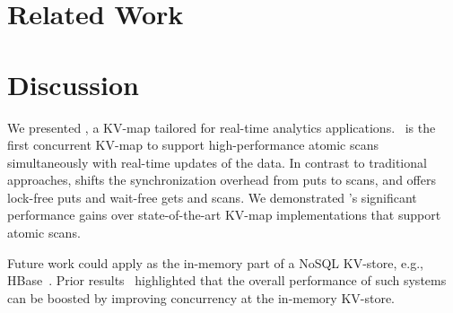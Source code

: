 \documentclass[10pt,preprint,numbers]{sigplanconf}
\begin{document}





\section{Related Work}
\label{sec:related}






\section{Discussion}
\label{sec:disc}

We presented {\kiwi}, a KV-map tailored for real-time analytics applications. \kiwi\ is the first
concurrent KV-map to support high-performance atomic scans simultaneously with real-time updates of the data.
In contrast to traditional approaches, {\kiwi} shifts the synchronization
overhead from puts to scans, and offers lock-free puts and wait-free gets and scans.
We demonstrated {\kiwi}'s significant performance gains over state-of-the-art KV-map
implementations that support atomic scans. 

Future work could apply {\kiwi} as the in-memory part of a NoSQL KV-store, e.g., HBase~\cite{ApacheHBase}.
Prior results~\cite{GolanGueta2015} highlighted that the overall  performance of such systems can be boosted by
improving  concurrency at the in-memory KV-store.



%

%
\end{document}
